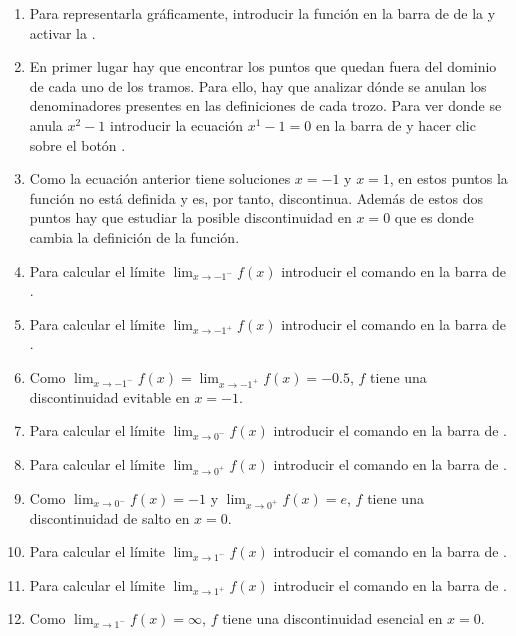 \begin{enumerate}[leftmargin=*]
      \begin{indication}
      \begin{enumerate}
      \item Para representarla gráficamente, introducir la función  en la barra de  de la  y activar la .
      \item En primer lugar hay que encontrar los puntos que quedan fuera del dominio de cada uno de los tramos.
            Para ello, hay que analizar dónde se anulan los denominadores presentes en las definiciones de cada trozo.
            Para ver donde se anula $x^2-1$ introducir la ecuación $x^1-1=0$ en la barra de  y hacer clic sobre el botón .
      \item Como la ecuación anterior tiene soluciones $x=-1$ y $x=1$, en estos puntos la función no está definida y es, por tanto, discontinua.
            Además de estos dos puntos hay que estudiar la posible discontinuidad en $x=0$ que es donde cambia la definición de la función.
      \item Para calcular el límite $\lim_{x\rightarrow -1^-}f(x)$ introducir el comando  en la barra de .
      \item Para calcular el límite $\lim_{x\rightarrow -1^+}f(x)$ introducir el comando  en la barra de .
      \item Como $\lim_{x\rightarrow -1^-}f(x)=\lim_{x\rightarrow -1^+}f(x)=-0.5$, $f$ tiene una discontinuidad evitable en $x=-1$.
      \item Para calcular el límite $\lim_{x\rightarrow 0^-}f(x)$ introducir el comando  en la barra de .
      \item Para calcular el límite $\lim_{x\rightarrow 0^+}f(x)$ introducir el comando  en la barra de .
      \item Como $\lim_{x\rightarrow 0^-}f(x)=-1$ y $\lim_{x\rightarrow 0^+}f(x)=e$, $f$ tiene una discontinuidad de salto en $x=0$.
      \item Para calcular el límite $\lim_{x\rightarrow 1^-}f(x)$ introducir el comando  en la barra de .
      \item Para calcular el límite $\lim_{x\rightarrow 1^+}f(x)$ introducir el comando  en la barra de .
      \item Como $\lim_{x\rightarrow 1^-}f(x)=\infty$, $f$ tiene una discontinuidad esencial en $x=0$.
      \end{enumerate}
      \end{indication}
\end{enumerate}


